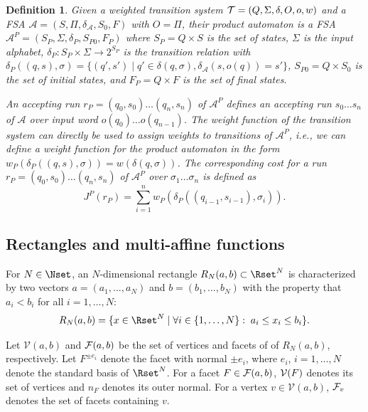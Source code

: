\documentclass{ifacconf}
\newtheorem{definition}{Definition}
\newcommand{\FNab}{{\cal F}(a,b)}
\newcommand{\VNset}{\mathcal{V}(a,b)}
\newcommand{\RNab}{R_N(a,b)}
\newcommand{\TS}{{\cal T}}
\newcommand{\AUTOMATON}{\ensuremath{\mathcal{A}}}
\newcommand{\PREDSET}{\ensuremath{\Pi}}
\begin{document}
\begin{definition}\label{def:product_automaton}
Given a weighted transition system $\TS=(Q, \Sigma, \delta, O, o, w)$ and a FSA $\AUTOMATON = (S, \PREDSET, \delta_\AUTOMATON, S_0, F)$ with $O=\PREDSET$, their product automaton is a FSA $\AUTOMATON^P = (S_P, \Sigma, \delta_P, S_{P0}, F_P)$ where $S_P=Q\times S$ is the set of states, $\Sigma$ is the input alphabet, 
$\delta_P: S_P \times \Sigma \longrightarrow 2^{S_P}$ is the transition relation with $\delta_P((q,s), \sigma)=\{(q',s') \mid q' \in \delta(q, \sigma), \delta_\AUTOMATON(s, o(q)) = s'\}$,
$S_{P0}=Q\times S_0$ is the set of initial states, and $F_P=Q\times F$ is the set of final states.


An accepting run $r_P = (q_0,s_0)\ldots (q_n,s_n)$ of $\AUTOMATON^P$ defines an accepting run $s_0\ldots s_n$ of $\AUTOMATON$ over input word $o(q_0)\ldots o(q_{n-1})$.
The weight function of the transition system can directly be used to assign weights to transitions of $\AUTOMATON^P$, i.e., we can define a weight function for the product automaton in the form $w_P( \delta_P((q,s), \sigma)) = w( \delta(q,\sigma))$. 
The corresponding cost for a run $r_P = (q_0,s_0)\ldots (q_n,s_n)$ of $\AUTOMATON^P$ over $\sigma_1\ldots \sigma_n$ is defined as 
\[J^P(r_P)= \sum_{i=1}^n w_P(\delta_P((q_{i-1},s_{i-1}), \sigma_i)).\] 
\end{definition}
\newcommand{\SIGNLETTER}{\gamma}
\subsection{Rectangles and multi-affine functions}
For $N \in \Nset$, an $N$-dimensional rectangle $\RNab \subset \Rset^N$ is
characterized by two vectors $a = (a_1,\ldots,a_N)$ and $b =
(b_1,\ldots,b_N)$ with the property that $a_i < b_i$ for all $i =
1,\ldots,N$:
\begin{equation}\label{eq:rec}
\begin{array}{l}
  \RNab =  \{x \in \Rset^N \mid \forall i \in \{1,\ldots,N\}:\; a_i \leq x_i \leq b_i\}.
\end{array}
\end{equation}

Let $\VNset$ and $\FNab$ be the set of vertices and facets of 
of $\RNab$, respectively. 
Let $F^{\pm e_i}$ denote the facet with normal $\pm e_i$, where 
$e_i$, $i=1,\ldots,N$ denote the standard basis of $\Rset^N$.
For a facet $F\in \FNab$, ${\cal V}(F)$  denotes its set of vertices
and $n_F$ denotes its outer normal. For a vertex $v \in \VNset$, ${\cal F}_v$ denotes the set of facets containing $v$. 
\end{document}
